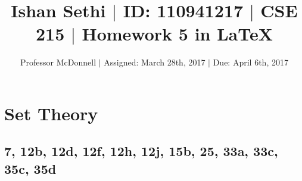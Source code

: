 \documentclass[11pt]{article}
\begin{document}
\title{\vspace{-.5in} Ishan Sethi $|$ ID: 110941217 $|$ CSE 215 $|$ Homework 5 in \LaTeX}
\author{Professor McDonnell $|$ Assigned: March 28th, 2017 $|$ Due: April 6th, 2017}
\date{}
\maketitle
\hrulefill
\tableofcontents

\section{Set Theory}
\subsection{7, 12b, 12d, 12f, 12h, 12j, 15b, 25, 33a, 33c, 35c, 35d}
\end{document}
